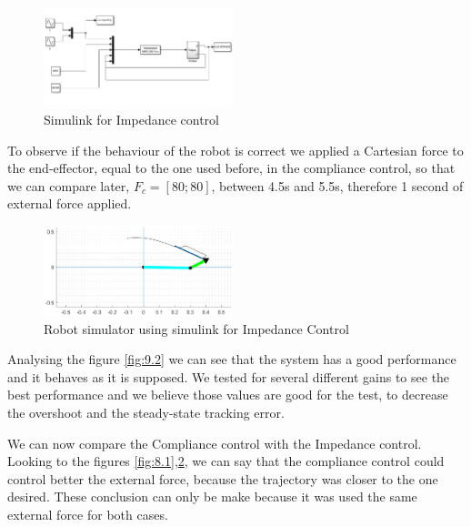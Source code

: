 \begin{figure}[H]
    \centering
    \includegraphics[width=0.49\textwidth]{imgs/9.1.png}
    \caption{Simulink for Impedance control}
    \label{fig:9.1}
\end{figure}

To observe if the behaviour of the robot is correct we applied a Cartesian force to the end-effector, equal to the one used before, in the compliance control, so that we can compare later, $F_c = [80;80]$, between 4.5s and 5.5s, therefore 1 second of external force applied.

\begin{figure}[H]
    \centering
    \includegraphics[width=0.49\textwidth]{imgs/9.2.eps}
    \caption{Robot simulator using simulink for Impedance Control}
    \label{fig:9.2}
\end{figure}

Analysing the figure \eqref{fig:9.2} we can see that the system has a good performance and it behaves as it is supposed. We tested for several different gains to see the best performance and we believe those values are good for the test, to decrease the overshoot and the steady-state tracking error.

We can now compare the Compliance control with the Impedance control. Looking to the figures \ref{fig:8.1},\ref{fig:9.2}, we can say that the compliance control could control better the external force, because the trajectory was closer to the one desired. These conclusion can only be make because it was used the same external force for both cases.




















